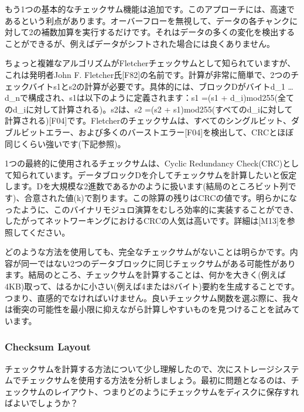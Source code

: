 もう1つの基本的なチェックサム機能は追加です。このアプローチには、高速であるという利点があります。オーバーフローを無視して、データの各チャンクに対して2の補数加算を実行するだけです。それはデータの多くの変化を検出することができるが、例えばデータがシフトされた場合には良くありません。

ちょっと複雑なアルゴリズムがFletcherチェックサムとして知られていますが、これは発明者John
F.
Fletcher氏{[}F82{]}の名前です。計算が非常に簡単で、2つのチェックバイトs1とs2の計算が必要です。具体的には、ブロックDがバイトd\_1
\ldots{} d\_nで構成され、s1は以下のように定義されます：s1 =(s1 +
d\_i)mod255(全てのd\_iに対して計算される)。s2は、s2 =(s2 +
s1)mod255(すべてのd\_iに対して計算される){[}F04{]}です。Fletcherのチェックサムは、すべてのシングルビット、ダブルビットエラー、および多くのバーストエラー{[}F04{]}を検出して、CRCとほぼ同じくらい強いです(下記参照)。

1つの最終的に使用されるチェックサムは、Cyclic Redundancy
Check(CRC)として知られています。データブロックDを介してチェックサムを計算したいと仮定します。Dを大規模な2進数であるかのように扱います(結局のところビット列です)、合意された値(k)で割ります。この除算の残りはCRCの値です。明らかになったように、このバイナリモジュロ演算をむしろ効率的に実装することができ、したがってネットワーキングにおけるCRCの人気は高いです。詳細は{[}M13{]}を参照してください。

どのような方法を使用しても、完全なチェックサムがないことは明らかです。内容が同一ではない2つのデータブロックに同じチェックサムがある可能性があります。結局のところ、チェックサムを計算することは、何かを大きく(例えば4KB)取って、はるかに小さい(例えば4または8バイト)要約を生成することです。つまり、直感的でなければいけません。良いチェックサム関数を選ぶ際に、我々は衝突の可能性を最小限に抑えながら計算しやすいものを見つけることを試みています。

\hypertarget{checksum-layout}{%
\subsubsection*{Checksum Layout}\label{checksum-layout}}

チェックサムを計算する方法について少し理解したので、次にストレージシステムでチェックサムを使用する方法を分析しましょう。最初に問題となるのは、チェックサムのレイアウト、つまりどのようにチェックサムをディスクに保存すればよいでしょうか？

